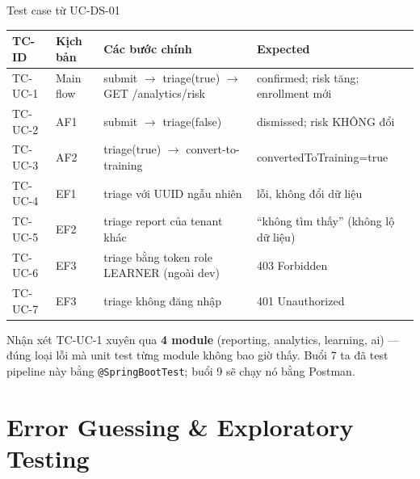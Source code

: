 \documentclass[aspectratio=169,12pt]{beamer}
\begin{document}
\begin{frame}[shrink=10]{Test case từ UC-DS-01}
  \begin{center}
  \small
  \setlength{\tabcolsep}{4pt}
  \renewcommand{\arraystretch}{0.95}
  \begin{tabularx}{\textwidth}{l l >{\raggedright\arraybackslash}X l}
    \toprule
    \textbf{TC-ID} & \textbf{Kịch bản} & \textbf{Các bước chính} & \textbf{Expected} \\
    \midrule
    TC-UC-1 & Main flow & submit $\to$ triage(true) $\to$ GET /analytics/risk & confirmed; risk tăng; enrollment mới \\
    TC-UC-2 & AF1 & submit $\to$ triage(false) & dismissed; risk KHÔNG đổi \\
    TC-UC-3 & AF2 & triage(true) $\to$ convert-to-training & convertedToTraining=true \\
    TC-UC-4 & EF1 & triage với UUID ngẫu nhiên & lỗi, không đổi dữ liệu \\
    TC-UC-5 & EF2 & triage report của tenant khác & ``không tìm thấy'' (không lộ dữ liệu) \\
    TC-UC-6 & EF3 & triage bằng token role LEARNER (ngoài dev) & 403 Forbidden \\
    TC-UC-7 & EF3 & triage không đăng nhập & 401 Unauthorized \\
    \bottomrule
  \end{tabularx}
  \renewcommand{\arraystretch}{1}
  \end{center}

  \vspace{0.15em}
  \begin{exampleblock}{Nhận xét}
    \small TC-UC-1 xuyên qua \textbf{4 module} (reporting, analytics, learning, ai)
    --- đúng loại lỗi mà unit test từng module không bao giờ thấy.
    Buổi 7 ta đã test pipeline này bằng \texttt{@SpringBootTest}; buổi 9 sẽ
    chạy nó bằng Postman.
  \end{exampleblock}
\end{frame}

\section{Error Guessing \& Exploratory Testing}
\end{document}
